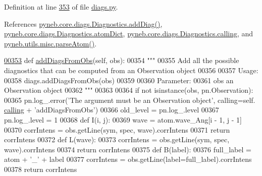 Definition at line \hyperlink{diags_8py_source_l00353}{353} of file \hyperlink{diags_8py_source}{diags.\+py}.



References \hyperlink{diags_8py_source_l00246}{pyneb.\+core.\+diags.\+Diagnostics.\+add\+Diag()}, \hyperlink{diags_8py_source_l00407}{pyneb.\+core.\+diags.\+Diagnostics.\+atom\+Dict}, \hyperlink{diags_8py_source_l00169}{pyneb.\+core.\+diags.\+Diagnostics.\+calling}, and \hyperlink{misc_8py_source_l00117}{pyneb.\+utils.\+misc.\+parse\+Atom()}.


\begin{DoxyCode}
\hypertarget{classpyneb_1_1core_1_1diags_1_1_diagnostics_l00353}{}\hyperlink{classpyneb_1_1core_1_1diags_1_1_diagnostics_a226aecfddebb567e7fe55731363635fc}{00353}     \textcolor{keyword}{def }\hyperlink{classpyneb_1_1core_1_1diags_1_1_diagnostics_a226aecfddebb567e7fe55731363635fc}{addDiagsFromObs}(self, obs):
00354         \textcolor{stringliteral}{"""}
00355 \textcolor{stringliteral}{        Add all the possible diagnostics that can be computed from an Observation object}
00356 \textcolor{stringliteral}{        }
00357 \textcolor{stringliteral}{        Usage:}
00358 \textcolor{stringliteral}{            diags.addDiagsFromObs(obs)}
00359 \textcolor{stringliteral}{            }
00360 \textcolor{stringliteral}{        Parameter:}
00361 \textcolor{stringliteral}{            obs     an Observation object}
00362 \textcolor{stringliteral}{        """}
00363         
00364         \textcolor{keywordflow}{if} \textcolor{keywordflow}{not} isinstance(obs, pn.Observation):
00365             pn.log\_.error(\textcolor{stringliteral}{'The argument must be an Observation object'}, calling=self.
      \hyperlink{classpyneb_1_1core_1_1diags_1_1_diagnostics_a07dce673fec8b2383ef411ab94b0b2fe}{calling} + \textcolor{stringliteral}{'addDiagsFromObs'})
00366         old\_level = pn.log\_.level
00367         pn.log\_.level = 1
00368         \textcolor{keyword}{def }I(i, j):
00369             wave = atom.wave\_Ang[i - 1, j - 1]
00370             corrIntens = obs.getLine(sym, spec, wave).corrIntens
00371             \textcolor{keywordflow}{return} corrIntens
00372         \textcolor{keyword}{def }L(wave):
00373             corrIntens = obs.getLine(sym, spec, wave).corrIntens
00374             \textcolor{keywordflow}{return} corrIntens
00375         \textcolor{keyword}{def }B(label):
00376             full\_label = atom + \textcolor{stringliteral}{'\_'} + label
00377             corrIntens = obs.getLine(label=full\_label).corrIntens
00378             \textcolor{keywordflow}{return} corrIntens

\end{DoxyCode}
